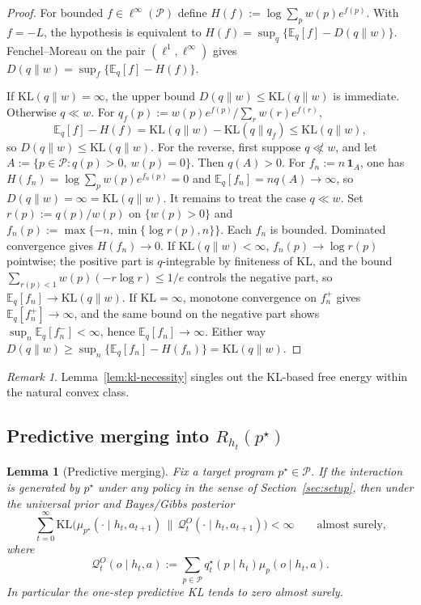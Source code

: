 \documentclass[11pt]{article}
\newtheorem{lemma}[theorem]{Lemma}
\theoremstyle{definition}
\theoremstyle{remark}
\newtheorem{remark}[theorem]{Remark}
\newcommand{\Pcal}{\mathcal{P}}
\newcommand{\Qcal}{\mathcal{Q}}
\newcommand{\E}{\mathbb{E}}
\newcommand{\KL}{\mathrm{KL}}
\newcommand{\one}{\mathbf{1}}
\begin{document}
\begin{proof}
For bounded $f\in\ell^\infty(\Pcal)$ define $H(f):=\log\sum_p w(p)e^{f(p)}$. With $f=-L$, the hypothesis is equivalent to $H(f)=\sup_q\{\E_q[f]-D(q\|w)\}$. Fenchel--Moreau on the pair $(\ell^1,\ell^\infty)$ gives $D(q\|w)=\sup_f\{\E_q[f]-H(f)\}$.

If $\KL(q\|w)=\infty$, the upper bound $D(q\|w)\le \KL(q\|w)$ is immediate. Otherwise $q\ll w$. For $q_f(p):=w(p)e^{f(p)}/\sum_r w(r)e^{f(r)}$,
\[
\E_q[f]-H(f)=\KL(q\|w)-\KL(q\|q_f)\le \KL(q\|w),
\]
so $D(q\|w)\le\KL(q\|w)$. For the reverse, first suppose $q\not\ll w$, and let $A:=\{p\in\Pcal:q(p)>0,\ w(p)=0\}$. Then $q(A)>0$. For $f_n:=n\,\one_A$, one has $H(f_n)=\log\sum_p w(p)e^{f_n(p)}=0$ and $\E_q[f_n]=nq(A)\to\infty$, so $D(q\|w)=\infty=\KL(q\|w)$. It remains to treat the case $q\ll w$. Set $r(p):=q(p)/w(p)$ on $\{w(p)>0\}$ and $f_n(p):=\max\{-n,\min\{\log r(p),n\}\}$. Each $f_n$ is bounded. Dominated convergence gives $H(f_n)\to 0$. If $\KL(q\|w)<\infty$, $f_n(p)\to\log r(p)$ pointwise; the positive part is $q$-integrable by finiteness of $\KL$, and the bound $\sum_{r(p)<1}w(p)(-r\log r)\le 1/e$ controls the negative part, so $\E_q[f_n]\to\KL(q\|w)$. If $\KL=\infty$, monotone convergence on $f_n^+$ gives $\E_q[f_n^+]\to\infty$, and the same bound on the negative part shows $\sup_n\E_q[f_n^-]<\infty$, hence $\E_q[f_n]\to\infty$. Either way $D(q\|w)\ge\sup_n\{\E_q[f_n]-H(f_n)\}=\KL(q\|w)$.
\end{proof}

\begin{remark}
Lemma~\ref{lem:kl-necessity} singles out the KL-based free energy within the natural convex class.
\end{remark}

\subsection{Predictive merging into $R_{h_t}(p^\star)$}

\begin{lemma}[Predictive merging]
\label{lem:merging}
Fix a target program $p^\star\in\Pcal$. If the interaction is generated by $p^\star$ under any policy in the sense of Section~\ref{sec:setup}, then under the universal prior and Bayes/Gibbs posterior
\[
\sum_{t=0}^{\infty}
\KL\!\bigl(\mu_{p^\star}(\cdot\mid h_t,a_{t+1})\,\|\,\Qcal_t^O(\cdot\mid h_t,a_{t+1})\bigr)
<\infty
\qquad
\text{almost surely,}
\]
where
\[
\Qcal_t^O(o\mid h_t,a):=\sum_{p\in\Pcal} q_t^\star(p\mid h_t)\mu_p(o\mid h_t,a).
\]
In particular the one-step predictive KL tends to zero almost surely.
\end{lemma}
\end{document}
